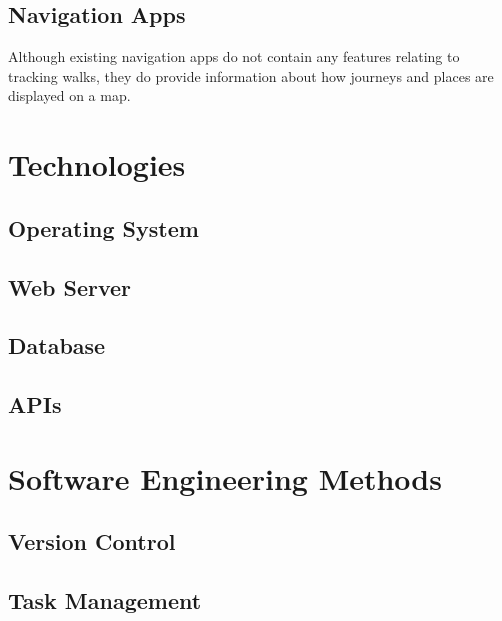 \subsection{Navigation Apps}

Although existing navigation apps do not contain any features relating to tracking walks, they do provide information about how journeys and places are displayed on a map.

\section{Technologies}

\subsection{Operating System}

\subsection{Web Server}

\subsection{Database}

\subsection{APIs}

\section{Software Engineering Methods}

\subsection{Version Control}

\subsection{Task Management}

